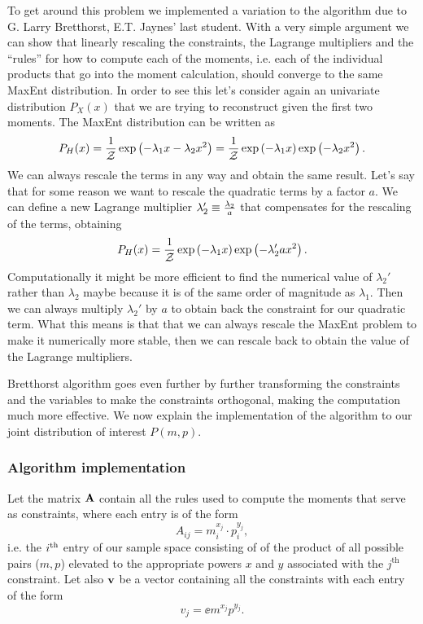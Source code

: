 To get around this problem we implemented a variation to the algorithm due to G.
Larry Bretthorst, E.T. Jaynes' last student. With a very simple argument we can
show that linearly rescaling the constraints, the Lagrange multipliers and the
``rules'' for how to compute each of the moments, i.e. each of the individual
products that go into the moment calculation, should converge to the same MaxEnt
distribution. In order to see this let's consider again an univariate
distribution $P_X(x)$ that we are trying to reconstruct given the first two
moments. The MaxEnt distribution can be written as
\begin{equation}
  P_H(x) = {1 \over \mathcal{Z}}
  \exp \left(- \lambda_1 x - \lambda_2 x^2 \right) =
  {1 \over \mathcal{Z}}
  \exp \left(- \lambda_1 x \right) \exp \left( - \lambda_2 x^2 \right).
\end{equation}
We can always rescale the terms in any way and obtain the same result. Let's say
that for some reason we want to rescale the quadratic terms by a factor $a$. We
can define a new Lagrange multiplier $\lambda_2' \equiv {\lambda_2 \over a}$
that compensates for the rescaling of the terms, obtaining
\begin{equation}
  P_H(x) = {1 \over \mathcal{Z}}
  \exp \left(- \lambda_1 x \right) \exp \left( - \lambda_2' ax^2 \right).
\end{equation}
Computationally it might be more efficient to find the numerical value of
$\lambda_2'$ rather than $\lambda_2$ maybe because it is of the same order of
magnitude as $\lambda_1$. Then we can always multiply $\lambda_2'$ by $a$ to
obtain back the constraint for our quadratic term. What this means is that that
we can always rescale the MaxEnt problem to make it numerically more stable,
then we can rescale back to obtain the value of the Lagrange multipliers.

Bretthorst algorithm goes even further by further transforming the constraints
and the variables to make the constraints orthogonal, making the computation
much more effective. We now explain the implementation of the algorithm to our
joint distribution of interest $P(m, p)$.

\subsubsection{Algorithm implementation}

Let the matrix $\mathbf{A}$ contain all the rules used to compute the moments that
serve as constraints, where each entry is of the form
\begin{equation}
  A_{ij} = m_i^{x_j} \cdot p_i^{y_j},
\end{equation}
i.e. the $i^\text{th}$ entry of our sample space consisting of of the product of all
possible pairs ($m, p$) elevated to the appropriate powers $x$ and $y$
associated with the $j^{\text{th}}$ constraint. Let also $\mathbf{v}$ be a vector
containing all the constraints with each entry of the form
\begin{equation}
  v_j = \ee{m^{x_j} p^{y_j}}.
\end{equation}

